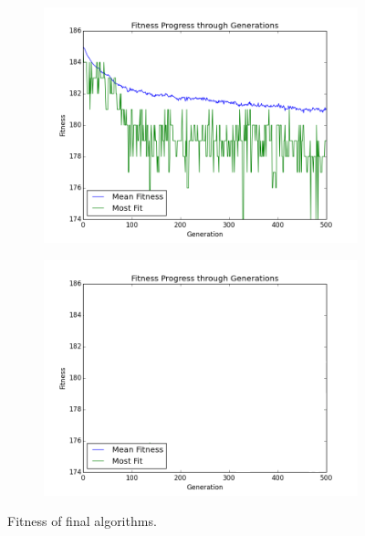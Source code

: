 \documentclass{article}
\begin{document}
\begin{figure}[ht]
\centering
\begin{subfigure}{0.5\textwidth}
\centering
\includegraphics[width=1\textwidth]{Figures/control_fitness}
\label{fig:control_fitness}
\end{subfigure}%
\begin{subfigure}{0.5\textwidth}
\centering
\includegraphics[width=1\textwidth]{Figures/final_fitness}
\label{fig:final_fitness}
\end{subfigure}

\caption{Fitness of final algorithms.}
\label{fig:fitness_comparison}
\end{figure}
\end{document}
